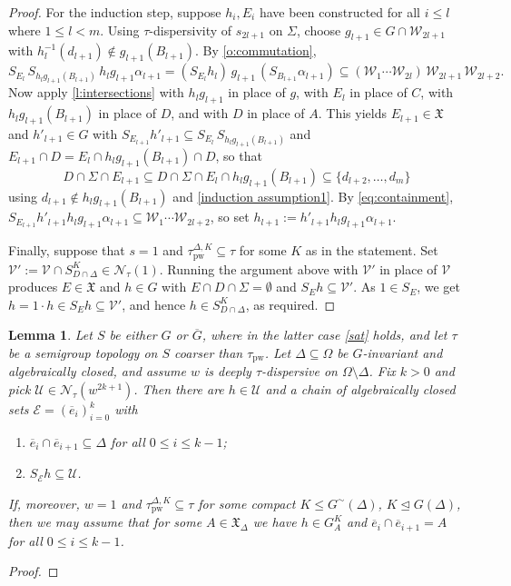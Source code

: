 \documentclass{article}
\newtheorem{lemma}[theorem]{Lemma}
\theoremstyle{remark}
\theoremstyle{definition}
\newcommand{\U}[0]{\mathbb{U}}
\newcommand{\nn}[0]{S}%
\renewcommand{\U}[0]{\mathcal{U}}
\newcommand{\V}[0]{\mathcal{V}}
\newcommand{\W}[0]{\mathcal{W}}
\newcommand{\pw}[0]{\tau_{\mathrm{pw}}}
\newcommand{\E}[0]{\mathcal{E}}
\newcommand{\X}[0]{\mathfrak{X}}
\renewcommand\leq{\leqslant}
\newcommand{\gc}[0]{G^{\sim}}
\begin{document}
{{{{{\begin{proof}
For the induction step, suppose $h_i, E_i$ have been constructed for all $i \le l$ where $1 \le l < m$. Using
  $\tau$-dispersivity of $s_{2l+1}$ on $\Sigma$, choose $g_{l+1} \in G \cap \W_{2l+1}$ with
  $h_l^{-1}(d_{l+1}) \notin g_{l+1}(B_{l+1})$. By \cref{o:commutation},
  \begin{equation}\label{eq:containment}
    \nn_{E_l}\, \nn_{h_l g_{l+1}(B_{l+1})}\, h_l g_{l+1} \alpha_{l+1}
      = (\nn_{E_l} h_l)\, g_{l+1}\, (\nn_{B_{l+1}} \alpha_{l+1})
      \subseteq (\W_1 \cdots \W_{2l})\, \W_{2l+1}\, \W_{2l+2}.
  \end{equation}
  {Now apply \cref{l:intersections} with $h_l g_{l+1}$ in place of $g$, with $E_l$ in place
of $C$, with $h_l g_{l+1}(B_{l+1})$ in place of $D$, and with $D$ in place of $A$.}
  This yields $E_{l+1} \in \X$ and $h'_{l+1} \in G$ with
  $\nn_{E_{l+1}} h'_{l+1} \subseteq \nn_{E_l}\, \nn_{h_l g_{l+1}(B_{l+1})}$ and
  $E_{l+1}\cap D = E_l \cap h_l g_{l+1}(B_{l+1})\cap D$, so that
  \[
    D \cap \Sigma \cap E_{l+1}\subseteq D\cap\Sigma\cap E_{l}\cap h_{l}g_{l+1}(B_{l+1})\subseteq \{d_{l+2}, \dots, d_m\}
  \]
  using $d_{l+1} \notin h_l g_{l+1}(B_{l+1})$ and \eqref{induction assumption1}. By
  \eqref{eq:containment},
  $\nn_{E_{l+1}} h'_{l+1} h_l g_{l+1} \alpha_{l+1} \subseteq \W_1 \cdots \W_{2l+2}$, so set
  $h_{l+1} := h'_{l+1} h_l g_{l+1} \alpha_{l+1}$.
 
    {Finally, suppose that $s = 1$ and $\pw^{\Delta, K} \subseteq \tau$ for some $K$ as in the
statement. Set $\V' := \V \cap \nn^K_{D \cap \Delta}\in \mathcal{N}_\tau(1)$. Running the argument above
with $\V'$ in place of $\V$ produces $E \in \X$ and $h \in G$ with
$E \cap D \cap \Sigma = \emptyset$ and $\nn_E h \subseteq \V'$. As $1 \in \nn_E$, we get
$h = 1 \cdot h \in \nn_E h \subseteq \V'$, and hence $h \in \nn^K_{D \cap \Delta}$, as
required.}
  \end{proof}


   \begin{lemma}\label{building chains}
  Let $S$ be either $G$ or $\overline{G}$, where in the latter case \ref{sat} holds, and let
  $\tau$ be a semigroup topology on $S$ coarser than $\pw$. Let $\Delta \subseteq \Omega$ be
  $G$-invariant and algebraically closed, and assume $w$ is deeply $\tau$-dispersive on
  $\Omega \setminus \Delta$. Fix $k > 0$ and pick $\U \in \mathcal{N}_\tau(w^{2k+1})$. Then
  there are $h \in \U$ and a chain of algebraically closed sets
  $\E = (\overline{e}_i)_{i=0}^{k}$ with
  \begin{enumerate}
    \item\label{propc} $\overline{e}_i \cap \overline{e}_{i+1} \subseteq \Delta$ for all $0 \le i \le k-1$;
    \item\label{propd} $\nn_{\E} h \subseteq \U$.
  \end{enumerate}
  If, moreover, $w = 1$ and {$\pw^{\Delta, K}\subseteq \tau$ for some compact $K\leq \gc(\Delta)$, $K\unlhd G(\Delta)$}, then we may assume {that for some $A \in \X_\Delta$ we have $h\in G_{A}^{K}$ and $\overline{e}_i \cap \overline{e}_{i+1} = A$ for all
  $0 \le i \le k-1$.}
\end{lemma}
   \begin{proof}


\end{proof}}}}}}
\end{document}
